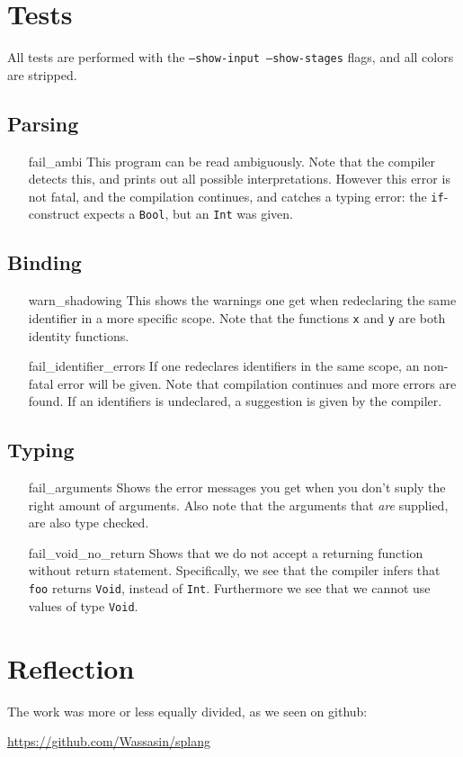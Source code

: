 \documentclass[14pt]{amsart}
\begin{document}
\section{Tests}
All tests are performed with the \texttt{--show-input --show-stages} flags, and all colors are stripped.
\subsection{Parsing}
\begin{itemize}
	\item[fail\_ambi] This program can be read ambiguously. Note that the compiler detects this, and prints out all possible interpretations. However this error is not fatal, and the compilation continues, and catches a typing error: the \texttt{if}-construct expects a \texttt{Bool}, but an \texttt{Int} was given.
\end{itemize}
\subsection{Binding}
\begin{itemize}
	\item[warn\_shadowing] This shows the warnings one get when redeclaring the same identifier in a more specific scope. Note that the functions \texttt{x} and \texttt{y} are both identity functions.
	\item[fail\_identifier\_errors] If one redeclares identifiers in the same scope, an non-fatal error will be given. Note that compilation continues and more errors are found. If an identifiers is undeclared, a suggestion is given by the compiler.
\end{itemize}
\subsection{Typing}
\begin{itemize}
	\item[fail\_arguments] Shows the error messages you get when you don't suply the right amount of arguments. Also note that the arguments that \emph{are} supplied, are also type checked.
	\item[fail\_void\_no\_return] Shows that we do not accept a returning function without return statement. Specifically, we see that the compiler infers that \texttt{foo} returns \texttt{Void}, instead of \texttt{Int}. Furthermore we see that we cannot use values of type \texttt{Void}.
\end{itemize}

\section{Reflection}
The work was more or less equally divided, as we seen on github:

\url{https://github.com/Wassasin/splang}
\end{document}
